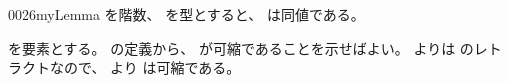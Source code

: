 \documentclass[index]{subfiles}
\begin{document}
\begin{myBlock}{0026}{myLemma}
  を階数、
  を型とすると、
  は同値である。
\end{myBlock}
\begin{myProof}
  を要素とする。
  の定義から、
  が可縮であることを示せばよい。
  よりは
  のレトラクトなので、
  より
  は可縮である。
\end{myProof}
\end{document}
